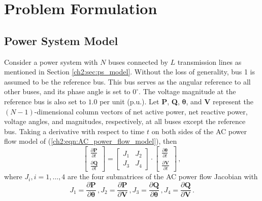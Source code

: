 \section{Problem Formulation}
\label{ch3:sec:formulation}

\subsection{Power System Model}
\label{ch3:sec:power_model}

Consider a power system with $N$ buses connected by $L$ transmission lines as mentioned in Section \ref{ch2:sec:ps_model}. Without the loss of generality, bus 1 is assumed to be the reference bus. This bus serves as the angular reference to all other buses, and its phase angle is set to $0^\circ$. The voltage magnitude at the reference bus is also set to $1.0$ per unit (p.u.). Let \textbf{P}, \textbf{Q}, $\boldsymbol{\theta}$, and \textbf{V} represent the $(N-1)$-dimensional column vectors of net active power, net reactive power, voltage angles, and magnitudes, respectively, at all buses except the reference bus. Taking a derivative with respect to time $t$ on both sides of the AC power flow model of (\ref{ch2:eqn:AC_power_flow_model}), then
\begin{equation}
\label{ch3:eqn:ac_jacobian}
\left[\begin{array}{c} \frac{\partial \textbf{P}}{\partial t} \\[.5em] \frac{\partial \textbf{Q}}{\partial t}\end{array}\right]
=
\left[\begin{array}{c|c}
{J}_1 & {J}_2 \\
 \hline {J}_3 & {J}_4 
 \end{array}\right] 
\cdot \left[\begin{array}{c} \frac{\partial \boldsymbol{\theta}}{\partial t} \\[.5em] \frac{\partial \textbf{V}}{\partial t}\end{array}\right] \,,
\end{equation}
where ${J}_i, i = 1, \dots, 4$ are the four submatrices of the AC power flow Jacobian with 
\begin{equation}
{J}_1 = \frac{\partial \textbf{P}}{\partial \boldsymbol{\theta}} \,,  {J}_2 = \frac{\partial \textbf{P}}{\partial \mathbf{V}} \,, {J}_3 = \frac{\partial \textbf{Q}}{\partial \boldsymbol{\theta}} \,, {J}_4 = \frac{\partial \textbf{Q}}{\partial \textbf{V}} \,.
\end{equation}
